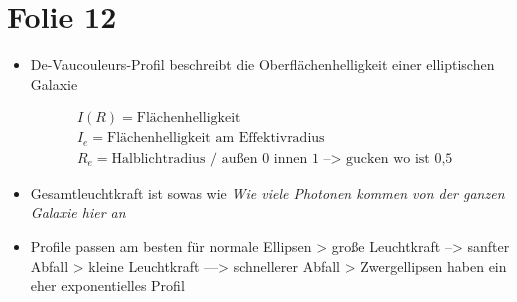 \section{Folie 12}

\begin{itemize}
\item De-Vaucouleurs-Profil beschreibt die Oberflächenhelligkeit einer elliptischen Galaxie
\end{itemize}

\begin{align*}
&I(R) = \text{Flächenhelligkeit} \\
&I_e = \text{Flächenhelligkeit am Effektivradius} \\
&R_e = \text{Halblichtradius / außen 0 innen 1 --> gucken wo ist 0,5}
\end{align*}


\begin{itemize}
\item Gesamtleuchtkraft ist sowas wie \textit{Wie viele Photonen kommen von der ganzen Galaxie hier an}
\item Profile passen am besten für normale Ellipsen
\subitem > große Leuchtkraft --> sanfter Abfall
\subitem > kleine Leuchtkraft ---> schnellerer Abfall
\subitem > Zwergellipsen haben ein eher exponentielles Profil
\end{itemize}



